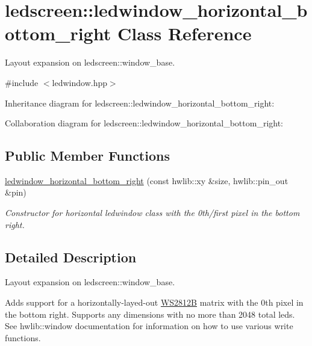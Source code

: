 \hypertarget{classledscreen_1_1ledwindow__horizontal__bottom__right}{}\section{ledscreen\+:\+:ledwindow\+\_\+horizontal\+\_\+bottom\+\_\+right Class Reference}
\label{classledscreen_1_1ledwindow__horizontal__bottom__right}


Layout expansion on ledscreen\+::window\+\_\+base.  




{\ttfamily \#include $<$ledwindow.\+hpp$>$}



Inheritance diagram for ledscreen\+:\+:ledwindow\+\_\+horizontal\+\_\+bottom\+\_\+right\+:


Collaboration diagram for ledscreen\+:\+:ledwindow\+\_\+horizontal\+\_\+bottom\+\_\+right\+:
\subsection*{Public Member Functions}
\begin{DoxyCompactItemize}
\item 
\hyperlink{classledscreen_1_1ledwindow__horizontal__bottom__right_a19462b2c6d50c4e254025956d846a845}{ledwindow\+\_\+horizontal\+\_\+bottom\+\_\+right} (const hwlib\+::xy \&size, hwlib\+::pin\+\_\+out \&pin)
\begin{DoxyCompactList}\small\item\em Constructor for horizontal ledwindow class with the 0th/first pixel in the bottom right. \end{DoxyCompactList}\end{DoxyCompactItemize}


\subsection{Detailed Description}
Layout expansion on ledscreen\+::window\+\_\+base. 

Adds support for a horizontally-\/layed-\/out \hyperlink{classledscreen_1_1WS2812B}{W\+S2812B} matrix with the 0th pixel in the bottom right. Supports any dimensions with no more than 2048 total leds. See hwlib\+::window documentation for information on how to use various write functions. 


